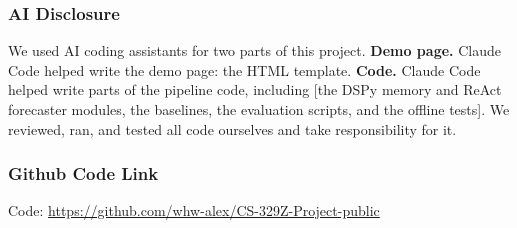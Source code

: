 \documentclass{article} %
\begin{document}
\subsubsection*{AI Disclosure}
We used AI coding assistants for two parts of this project.
\textbf{Demo page.} Claude Code helped write the demo page: the HTML template.
\textbf{Code.} Claude Code helped write parts of the pipeline code, including [the DSPy memory and ReAct forecaster modules, the baselines, the evaluation scripts, and the offline tests].
We reviewed, ran, and tested all code ourselves and take responsibility for it.

\subsubsection*{Github Code Link}
Code: \url{https://github.com/whw-alex/CS-329Z-Project-public}



\end{document}
